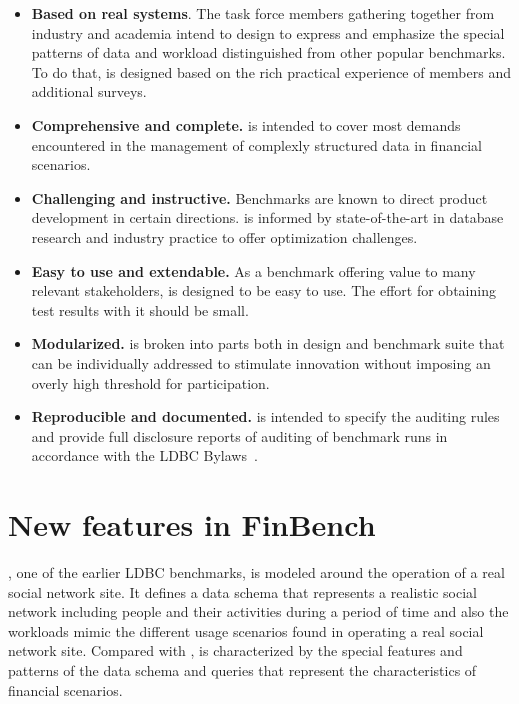 \begin{itemize}
      \item \textbf{Based on real systems}. The task force members gathering
            together from industry and academia intend to design \ldbcfinbench
            to express and emphasize the special patterns of data and workload
            distinguished from other popular benchmarks. To do that,
            \ldbcfinbench is designed based on the rich practical experience of
            members and additional surveys.
      \item \textbf{Comprehensive and complete.} \ldbcfinbench is intended to
            cover most demands encountered in the management of complexly
            structured data in financial scenarios.
      \item \textbf{Challenging and instructive.} Benchmarks are known to direct
            product development in certain directions. \ldbcfinbench is informed
            by state-of-the-art in database research and industry practice
            to offer optimization challenges.
      \item \textbf{Easy to use and extendable.} As a benchmark offering value
            to many relevant stakeholders, \ldbcfinbench is designed to be easy
            to use. The effort for obtaining test results with it should be
            small.
      \item \textbf{Modularized.} \ldbcfinbench is broken into parts both in
            design and benchmark suite that can be individually addressed to
            stimulate innovation without imposing an overly high threshold for
            participation.
      \item \textbf{Reproducible and documented.} \ldbcfinbench is intended to
            specify the auditing rules and provide full disclosure reports of
            auditing of benchmark runs in accordance with the LDBC
            Bylaws~\cite{ldbc_byelaws}.
\end{itemize}



\section{New features in FinBench}

\ldbcsnb, one of the earlier LDBC benchmarks, is modeled around the operation of a real social network site. It defines a data schema that represents a realistic social network including people and their activities during a period of time and also the workloads mimic the different usage scenarios found in operating a real social network site. Compared with \ldbcsnb, \ldbcfinbench is characterized by the special features and patterns of the data schema and queries that represent the characteristics of financial scenarios.


